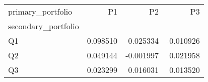 \begin{tabular}{lrrr}
\toprule
primary_portfolio & P1 & P2 & P3 \\
secondary_portfolio &  &  &  \\
\midrule
Q1 & 0.098510 & 0.025334 & -0.010926 \\
Q2 & 0.049144 & -0.001997 & 0.021958 \\
Q3 & 0.023299 & 0.016031 & 0.013520 \\
\bottomrule
\end{tabular}
